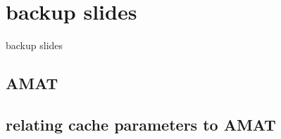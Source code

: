 

\section{backup slides}
\begin{frame}{backup slides}
\end{frame}
\subsection{AMAT}




\subsection{relating cache parameters to AMAT}



